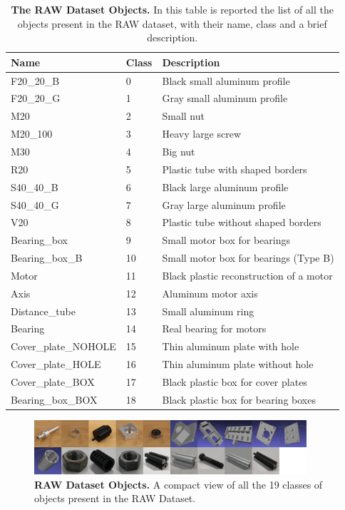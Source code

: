 \begin{table}
    \centering
    \begin{tabular}{| l | l | l |}
    \hline
    \textbf{Name} & \textbf{Class} & \textbf{Description} \\ \hline
    F20\_20\_B & 0 & Black small aluminum profile \\
    F20\_20\_G & 1 & Gray small aluminum profile \\
    M20 & 2 & Small nut \\
    M20\_100 & 3 & Heavy large screw \\
    M30 & 4 & Big nut \\
    R20 & 5 & Plastic tube with shaped borders \\
    S40\_40\_B & 6 & Black large aluminum profile \\
    S40\_40\_G & 7 & Gray large aluminum profile \\
    V20 & 8 & Plastic tube without shaped borders \\
    Bearing\_box & 9 & Small motor box for bearings \\
    Bearing\_box\_B & 10 & Small motor box for bearings (Type B) \\
    Motor & 11 & Black plastic reconstruction of a motor \\
    Axis & 12 & Aluminum motor axis \\
    Distance\_tube & 13 & Small aluminum ring \\
    Bearing & 14 & Real bearing for motors \\
    Cover\_plate\_NOHOLE & 15 & Thin aluminum plate with hole \\
    Cover\_plate\_HOLE & 16 & Thin aluminum plate without hole \\
    Cover\_plate\_BOX & 17 & Black plastic box for cover plates \\
    Bearing\_box\_BOX & 18 & Black plastic box for bearing boxes \\
    \hline
    \end{tabular}
    \caption{\textbf{The RAW Dataset Objects.} In this table is reported the list of all the objects present in the RAW dataset, with their name, class and a brief description.}
    \label{tab:raw_objs_list}
\end{table}

\begin{figure}
    \centering
    \includegraphics[width=0.9\textwidth]{figures/3_raw_dataset/raw_obj_examples}
    \caption{\textbf{RAW Dataset Objects.} A compact view of all the 19 classes of objects present in the RAW Dataset.}
    \label{fig:raw_obj_examples}
\end{figure}

